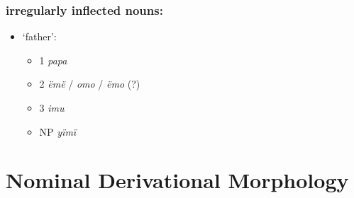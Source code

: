 \documentclass{memoir}
\begin{document}
\subsubsection{irregularly inflected nouns:}

\begin{itemize}
\tightlist
\item
  `father':

  \begin{itemize}
  \tightlist
  \item
    1 \emph{papa}
  \item
    2 \emph{ëmë} / \emph{omo} / \emph{ëmo} (?)
  \item
    3 \emph{imu}
  \item
    NP \emph{yïmï}
  \end{itemize}
\end{itemize}

\section{\texorpdfstring{Nominal Derivational Morphology
\label{sec:nounderiv}}{Nominal Derivational Morphology }}
\end{document}
